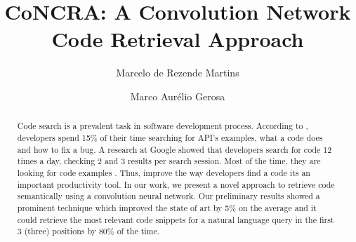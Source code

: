 \documentclass[sigconf]{acmart}
\begin{document}
\title{CoNCRA: A Convolution Network Code Retrieval Approach}

\author{Marcelo de Rezende Martins}


\author{Marco Aurélio Gerosa}




\begin{abstract}

  
  Code search is a prevalent task in software development process. According to \cite{what-developers-search-for-on-the-web:xia:2017}, developers spend 15\% of their time searching for API's examples, what a code does and how to fix a bug. A research at Google showed that developers search for code 12 times a day, checking 2 and 3 results per search session. Most of the time, they are looking for code examples \citep{sadowski-how-developers-search-for-code-case-study:2015}. Thus, improve the way developers find a code its an important productivity tool. In our work, we present a novel approach to retrieve code semantically using a convolution neural network. Our preliminary results showed a prominent technique which improved the state of art \citep{cambronero-deep-code-search-2019} by 5\% on the average and it could retrieve the most relevant code snippets for a natural language query in the first 3 (three) positions by 80\% of the time. 
  
  
  
\end{abstract}
\end{document}
